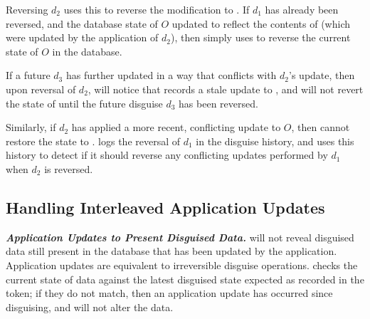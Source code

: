 Reversing $d_2$ uses this  to reverse the modification to . 
If $d_1$ has already been reversed, and the database state of $O$ updated to reflect the contents
of  (which were updated by the application of $d_2$), 
then \sys simply uses  to reverse the current state of $O$ in the database. 

If a future $d_3$ has further updated  in a way that conflicts with $d_2$'s update,
then upon reversal of $d_2$, \sys will notice that  records a stale update to , 
and will not revert
the state of  until the future disguise $d_3$ has been reversed.



Similarly, if $d_2$ has applied a more recent, conflicting update to $O$, then \sys cannot restore
the state to \ostart. 
\sys logs the reversal of $d_1$ in the disguise history, and uses this history to detect if it
should reverse any conflicting updates performed by $d_1$ when $d_2$ is reversed.


\iffalse
\subsection{Handling Interleaved Application Updates}
\noindent\textbf{\emph{Application Updates to Present Disguised Data.}}
\sys will not reveal disguised data still present in the database that has been updated by the
application. Application updates are equivalent to irreversible disguise operations.
\sys checks the current state of data against the latest disguised state
expected as recorded in the token; if they do not match, then an application update has occurred
since disguising, and \sys will not alter the data.

